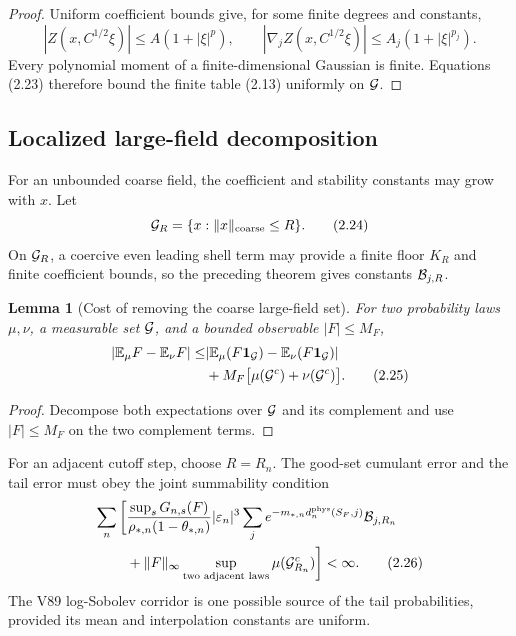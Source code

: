 \documentclass[11pt]{article}
\newtheorem{lemma}[theorem]{Lemma}
\theoremstyle{remark}
\begin{document}
\begin{proof}
Uniform coefficient bounds give, for some finite degrees and
constants,
\[
 |Z(x,C^{1/2}\xi)|\leq A(1+|\xi|^p),\qquad
 |\nabla_jZ(x,C^{1/2}\xi)|
 \leq A_j(1+|\xi|^{p_j}).                           \tag{2.23}
\]
Every polynomial moment of a finite-dimensional Gaussian is finite.
Equations (2.23) therefore bound the finite table (2.13) uniformly
on \({\cal G}\).
\end{proof}

\subsection{Localized large-field decomposition}

For an unbounded coarse field, the coefficient and stability
constants may grow with \(x\).  Let
\[
 {\cal G}_R=\{x:\|x\|_{\rm coarse}\leq R\}.          \tag{2.24}
\]
On \({\cal G}_R\), a coercive even leading shell term may provide a
finite floor \(K_R\) and finite coefficient bounds, so the preceding
theorem gives constants \({\cal B}_{j,R}\).

\begin{lemma}[Cost of removing the coarse large-field set]
\label{lem:v17v2-large-field}
For two probability laws \(\mu,\nu\), a measurable set
\({\cal G}\), and a bounded observable \(|F|\leq M_F\),
\[
\begin{split}
 |{\mathbb E}_\mu F-{\mathbb E}_\nu F|
 \leq&
 |{\mathbb E}_\mu(F{\bf1}_{\cal G})
  -{\mathbb E}_\nu(F{\bf1}_{\cal G})|\\
 &+M_F\bigl[
 \mu({\cal G}^{c})+\nu({\cal G}^{c})
 \bigr].                                           \tag{2.25}
\end{split}
\]
\end{lemma}

\begin{proof}
Decompose both expectations over \({\cal G}\) and its complement and
use \(|F|\leq M_F\) on the two complement terms.
\end{proof}

For an adjacent cutoff step, choose \(R=R_n\).  The good-set
cumulant error and the tail error must obey the joint summability
condition
\[
\begin{split}
 \sum_n\bigg[
 &\frac{\sup_sG_{n,s}(F)}
 {\rho_{*,n}(1-\theta_{*,n})}
 |\varepsilon_n|^3
 \sum_j e^{-m_{*,n}d_n^{\rm phys}(S_F,j)}
 {\cal B}_{j,R_n}\\
 &+
 \|F\|_\infty
 \sup_{\text{two adjacent laws}}
 \mu({\cal G}_{R_n}^{c})
 \bigg]<\infty.                                    \tag{2.26}
\end{split}
\]
The V89 log-Sobolev corridor is one possible source of the tail
probabilities, provided its mean and interpolation constants are
uniform.
\end{document}
